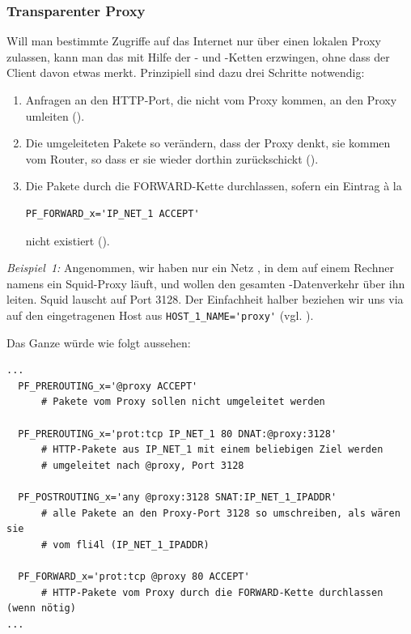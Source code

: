 \subsubsection{Transparenter Proxy}
Will man bestimmte Zugriffe auf das Internet nur über einen lokalen Proxy
zulassen, kann man das mit Hilfe der - und
-Ketten erzwingen, ohne dass der Client davon etwas merkt.
Prinzipiell sind dazu drei Schritte notwendig:

\begin{enumerate}
\item Anfragen an den HTTP-Port, die nicht vom Proxy kommen, an den
Proxy umleiten ().
\item Die umgeleiteten Pakete so verändern, dass der Proxy denkt, sie
kommen vom Router, so dass er sie wieder dorthin zurückschickt
().
\item Die Pakete durch die FORWARD-Kette durchlassen, sofern ein
Eintrag à la

\begin{example}
\begin{verbatim}
PF_FORWARD_x='IP_NET_1 ACCEPT'
\end{verbatim}
\end{example}

nicht existiert ().
\end{enumerate}

\emph{Beispiel~1:} Angenommen, wir haben nur ein Netz ,
in dem auf einem Rechner namens  ein Squid-Proxy läuft, und
wollen den gesamten -Datenverkehr über ihn leiten. Squid lauscht
auf Port 3128. Der Einfachheit halber beziehen wir uns via  auf
den eingetragenen Host aus \verb+HOST_1_NAME='proxy'+ (vgl.
).

Das Ganze würde wie folgt aussehen:

\begin{example}
\begin{verbatim}
...
  PF_PREROUTING_x='@proxy ACCEPT'
      # Pakete vom Proxy sollen nicht umgeleitet werden

  PF_PREROUTING_x='prot:tcp IP_NET_1 80 DNAT:@proxy:3128'
      # HTTP-Pakete aus IP_NET_1 mit einem beliebigen Ziel werden
      # umgeleitet nach @proxy, Port 3128

  PF_POSTROUTING_x='any @proxy:3128 SNAT:IP_NET_1_IPADDR'
      # alle Pakete an den Proxy-Port 3128 so umschreiben, als wären sie
      # vom fli4l (IP_NET_1_IPADDR)

  PF_FORWARD_x='prot:tcp @proxy 80 ACCEPT'
      # HTTP-Pakete vom Proxy durch die FORWARD-Kette durchlassen (wenn nötig)
...
\end{verbatim}
\end{example}

